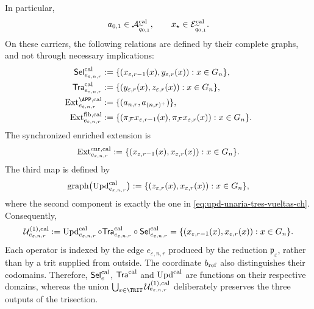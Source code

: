In particular,
\[
 a_{0,1}\in\mathcal A^{\rm cal}_{\widetilde q_{0,1}},
 \qquad
 x_\star\in\mathcal E^{\rm cal}_{\widetilde q_{0,1}}.
\]
On these carriers, the following relations are defined by their complete
graphs, and not through necessary implications:
\begin{align}
 \mathsf{Sel}^{\rm cal}_{e_{\varepsilon,n,r}}
   &:=\{(x_{\varepsilon,r-1}(x),y_{\varepsilon,r}(x)):
          x\in G_n\},\\
 \mathsf{Tra}^{\rm cal}_{e_{\varepsilon,n,r}}
   &:=\{(y_{\varepsilon,r}(x),z_{\varepsilon,r}(x)):
          x\in G_n\},\\
 \operatorname{Ext}^{\APP,\rm cal}_{e_{\varepsilon,n,r}}
   &:=\{(a_{n,r},a_{(n,r)^+})\},
 \label{eq:ext-app-calibrada-ch}\\
 \operatorname{Ext}^{\rm fib,cal}_{e_{\varepsilon,n,r}}
   &:=\{(\pi_{\mathcal F}x_{\varepsilon,r-1}(x),
          \pi_{\mathcal F}x_{\varepsilon,r}(x)):x\in G_n\}.
 \label{eq:ext-fibra-calibrada-ch}
\end{align}
The synchronized enriched extension is
\begin{equation}
 \operatorname{Ext}^{\rm enr,cal}_{e_{\varepsilon,n,r}}
 :=\{(x_{\varepsilon,r-1}(x),x_{\varepsilon,r}(x)):
       x\in G_n\}.
 \label{eq:ext-enriquecida-calibrada-ch}
\end{equation}
The third map is defined by
\begin{equation}
 \operatorname{graph}
 \bigl(\operatorname{Upd}^{\rm cal}_{e_{\varepsilon,n,r}}\bigr)
 :=\{(z_{\varepsilon,r}(x),x_{\varepsilon,r}(x)):
       x\in G_n\},
 \label{eq:grafo-upd-calibrado-ch}
\end{equation}
where the second component is exactly the one in
\eqref{eq:upd-unaria-tres-vueltas-ch}. Consequently,
\begin{equation}
 \mathcal U^{(1),\rm cal}_{e_{\varepsilon,n,r}}
 :=\operatorname{Upd}^{\rm cal}_{e_{\varepsilon,n,r}}\circ
   \mathsf{Tra}^{\rm cal}_{e_{\varepsilon,n,r}}\circ
   \mathsf{Sel}^{\rm cal}_{e_{\varepsilon,n,r}}
 =\{(x_{\varepsilon,r-1}(x),x_{\varepsilon,r}(x)):
      x\in G_n\}.
 \label{eq:transicion-cal-en-tpk-ch}
\end{equation}
Each operator is indexed by the edge \(e_{\varepsilon,n,r}\) produced by the
reduction \(\mathfrak p_\varepsilon\), rather than by a trit supplied from
outside. The coordinate \(b_{\rm ref}\) also distinguishes their codomains.
Therefore,
\(\mathsf{Sel}^{\rm cal}_{e}\),
\(\mathsf{Tra}^{\rm cal}\) and \(\operatorname{Upd}^{\rm cal}\) are functions
on their respective domains, whereas the union
\(\bigcup_{\varepsilon\in\TRIT}
\mathcal U^{(1),\rm cal}_{e_{\varepsilon,n,r}}\) deliberately preserves the
three outputs of the trisection.

